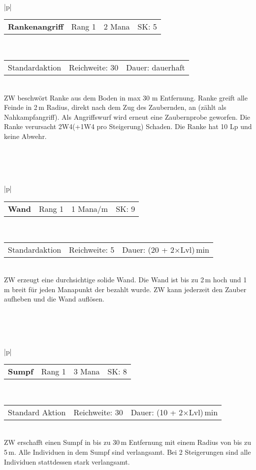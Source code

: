 \documentclass[../../Heldenanleitung2]{subfiles}
\begin{document}
\\\\\\
\begin{tabular}{|p{\textwidth}|}
\hline
\begin{tabularx}{\textwidth}{X|X|X|X}
\textbf{Rankenangriff} & Rang 1 & 2 Mana & SK: 5
\end{tabularx} \\ \hline
\begin{tabularx}{\textwidth}{X|X|X}
Standardaktion & Reichweite: 30 & Dauer: dauerhaft
\end{tabularx} \\ \hline
ZW beschwört Ranke aus dem Boden in max 30 m Entfernung. Ranke greift alle Feinde in 2\,m Radius, direkt nach dem Zug des Zaubernden, an (zählt als Nahkampfangriff). Als Angriffswurf wird erneut eine Zaubernprobe geworfen. Die Ranke verursacht 2W4(+1W4 pro Steigerung) Schaden. Die Ranke hat 10 Lp und keine Abwehr.
\\ \hline
\end{tabular}
\\\\\\
\begin{tabular}{|p{\textwidth}|}
\hline
\begin{tabularx}{\textwidth}{X|X|X|X}
\textbf{Wand} & Rang 1 & 1 Mana/m & SK: 9
\end{tabularx} \\ \hline
\begin{tabularx}{\textwidth}{X|X|X}
Standardaktion & Reichweite: 5 & Dauer: (20 + 2$\times$Lvl)\,min
\end{tabularx} \\ \hline
ZW erzeugt eine durchsichtige solide Wand. Die Wand ist bis zu 2\,m hoch und 1\,m breit für jeden Manapunkt der bezahlt wurde. ZW kann jederzeit den Zauber aufheben und die Wand auflösen.
\\ \hline
\end{tabular}
\\\\\\
\begin{tabular}{|p{\textwidth}|}
\hline
\begin{tabularx}{\textwidth}{X|X|X|X}
\textbf{Sumpf} & Rang 1 & 3 Mana & SK: 8
\end{tabularx} \\ \hline
\begin{tabularx}{\textwidth}{X|X|X}
Standard Aktion & Reichweite: 30 & Dauer: (10 + 2$\times$Lvl)\,min
\end{tabularx} \\ \hline
ZW erschafft einen Sumpf in bis zu 30\,m Entfernung mit einem Radius von bis zu 5\,m. Alle Individuen in dem Sumpf sind verlangsamt. Bei 2 Steigerungen sind alle Individuen stattdessen stark verlangsamt.
\\ \hline
\end{tabular}
\end{document}
